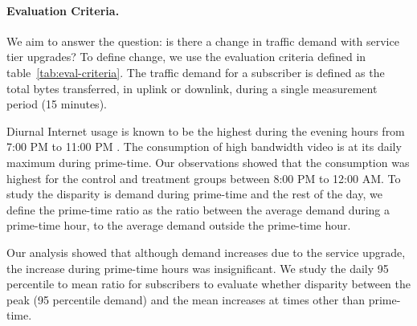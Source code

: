 \paragraph{Evaluation Criteria. } We aim to answer the question: is there a 
change in traffic demand with service tier upgrades? To define change, we use 
the evaluation criteria defined in table~\ref{tab:eval-criteria}. The traffic 
demand for a subscriber is defined as the total bytes transferred, in 
uplink or downlink, during a single measurement period (15 minutes).

Diurnal Internet usage is known to be the highest during the evening hours from 
7:00 PM to 11:00 PM \cite{fcc2015broadband-report}. The consumption of high 
bandwidth video is at its daily maximum during prime-time. Our observations 
showed that the consumption was highest for the control and treatment groups 
between 8:00 PM to 12:00 AM. To study the disparity is demand during prime-time 
and the rest of the day, we define the prime-time ratio as the ratio between 
the average demand during a prime-time hour, to the average demand outside the 
prime-time hour.

Our analysis showed that although demand increases due to the service upgrade, 
the increase during prime-time hours was insignificant. We study the daily 95 
percentile to mean ratio for subscribers to evaluate whether disparity between 
the peak (95 percentile demand) and the mean increases at times other than 
prime-time.







%
